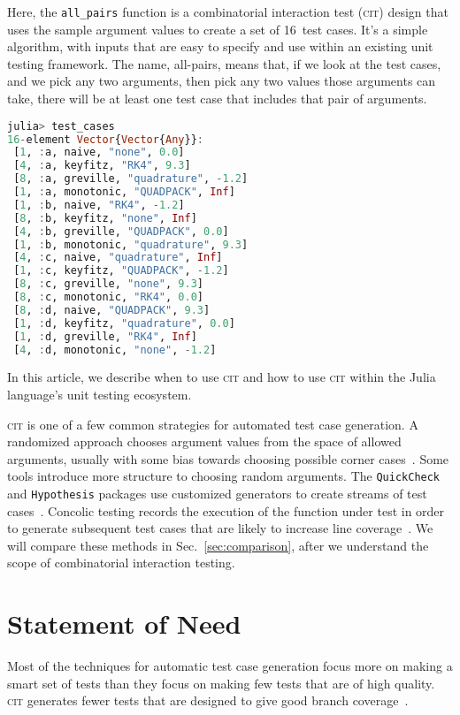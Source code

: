 \documentclass{juliacon}
\newcommand{\cit}{\textsc{cit}\xspace}
\begin{document}
Here, the \verb|all_pairs| function is a combinatorial interaction test (\cit) design that uses the sample argument values to create a set of 16~test cases. It's a simple algorithm, with inputs that are easy to specify and use within an existing unit testing framework. The name, all-pairs, means that, if we look at the test cases, and we pick any two arguments, then pick any two values those arguments can take, there will be at least one test case that includes that pair of arguments.
\begin{lstlisting}[language=Julia]
julia> test_cases
16-element Vector{Vector{Any}}:
 [1, :a, naive, "none", 0.0]
 [4, :a, keyfitz, "RK4", 9.3]
 [8, :a, greville, "quadrature", -1.2]
 [1, :a, monotonic, "QUADPACK", Inf]
 [1, :b, naive, "RK4", -1.2]
 [8, :b, keyfitz, "none", Inf]
 [4, :b, greville, "QUADPACK", 0.0]
 [1, :b, monotonic, "quadrature", 9.3]
 [4, :c, naive, "quadrature", Inf]
 [1, :c, keyfitz, "QUADPACK", -1.2]
 [8, :c, greville, "none", 9.3]
 [8, :c, monotonic, "RK4", 0.0]
 [8, :d, naive, "QUADPACK", 9.3]
 [1, :d, keyfitz, "quadrature", 0.0]
 [1, :d, greville, "RK4", Inf]
 [4, :d, monotonic, "none", -1.2]
 \end{lstlisting}
In this article, we describe when to use \cit and how to use \cit within the Julia language's unit testing ecosystem.

\vskip 6pt
\cit is one of a few common strategies for automated test case generation. A randomized approach chooses argument values from the space of allowed arguments, usually with some bias towards choosing possible corner cases~\cite{Lampropoulos2020-sd,Arcuri2012-az}. Some tools introduce more structure to choosing random arguments. The \texttt{QuickCheck} and \texttt{Hypothesis} packages use customized generators to create streams of test cases~\cite{loscher2018automating}. Concolic testing records the execution of the function under test in order to generate subsequent test cases that are likely to increase line coverage~\cite{King1976-jt,Wang2018-xh,vira2019}. We will compare these methods in Sec.~\ref{sec:comparison}, after we understand the scope of combinatorial interaction testing.

\section{Statement of Need}\label{sec:statement-of-need}

Most of the techniques for automatic test case generation focus more on making a smart set of tests than they focus on making few tests that are of high quality. \cit generates fewer tests that are designed to give good branch coverage~\cite{Nie2011-yl,Grindal2005-su,Kuhn2010-ak}.
\end{document}

